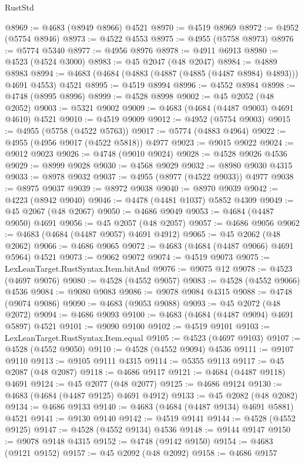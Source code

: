 \begin{lexlean}{RustStd}
\begin{coremodule}
@8969 := @4683 (@8949 @8966) @4521
@8970 := @4519 @8969
@8972 := @4952 (@5754 @8946)
@8973 := @4522 @4553
@8975 := @4955 (@5758 @8973)
@8976 := @5774 @5340
@8977 := @4956 @8976
@8978 := @4911 @6913
@8980 := @4523 (@4524 @3000)
@8983 := @45 @2047 (@48 @2047)
@8984 := @4889 @8983
@8994 := @4683 (@4684 (@4883 (@4887 (@4885 (@4487 @8984) @4893))) @4691 @4553) @4521
@8995 := @4519 @8994
@8996 := @4552 @8984
@8998 := @4748 (@8995 @8996)
@8999 := @4528 @8998
@9002 := @45 @2052 (@48 @2052)
@9003 := @5321 @9002
@9009 := @4683 (@4684 (@4487 @9003) @4691 @4610) @4521
@9010 := @4519 @9009
@9012 := @4952 (@5754 @9003)
@9015 := @4955 (@5758 (@4522 @5763))
@9017 := @5774 (@4883 @4964)
@9022 := @4955 (@4956 @9017 (@4522 @5818)) @4977
@9023 := @9015 @9022
@9024 := @9012 @9023
@9026 := @4748 (@9010 @9024)
@9028 := @4528 @9026 @4536
@9029 := @8999 @9028
@9030 := @4568 @9029
@9032 := @8980 @9030 @4315
@9033 := @8978 @9032
@9037 := @4955 (@8977 (@4522 @9033)) @4977
@9038 := @8975 @9037
@9039 := @8972 @9038
@9040 := @8970 @9039
@9042 := @4223 (@8942 @9040)
@9046 := @4478 (@4481 @1037) @5852 @4309
@9049 := @45 @2067 (@48 @2067)
@9050 := @4686 @9049
@9053 := @4684 (@4487 @9050) @4691
@9056 := @45 @2057 (@48 @2057)
@9057 := @4686 @9056
@9062 := @4683 (@4684 (@4487 @9057) @4691 @4912)
@9065 := @45 @2062 (@48 @2062)
@9066 := @4686 @9065
@9072 := @4683 (@4684 (@4487 @9066) @4691 @5964) @4521
@9073 := @9062 @9072
@9074 := @4519 @9073
@9075 := LexLeanTarget.RustSyntax.Item.bitAnd
@9076 := @9075 @12
@9078 := @4523 (@4697 @9076)
@9080 := @4528 (@4552 @9057)
@9083 := @4528 (@4552 @9066) @4536
@9084 := @9080 @9083
@9086 := @9078 @9084 @4315
@9088 := @4748 (@9074 @9086)
@9090 := @4683 (@9053 @9088)
@9093 := @45 @2072 (@48 @2072)
@9094 := @4686 @9093
@9100 := @4683 (@4684 (@4487 @9094) @4691 @5897) @4521
@9101 := @9090 @9100
@9102 := @4519 @9101
@9103 := LexLeanTarget.RustSyntax.Item.equal
@9105 := @4523 (@4697 @9103)
@9107 := @4528 (@4552 @9050)
@9110 := @4528 (@4552 @9094) @4536
@9111 := @9107 @9110
@9113 := @9105 @9111 @4315
@9114 := @5355 @9113
@9117 := @45 @2087 (@48 @2087)
@9118 := @4686 @9117
@9121 := @4684 (@4487 @9118) @4691
@9124 := @45 @2077 (@48 @2077)
@9125 := @4686 @9124
@9130 := @4683 (@4684 (@4487 @9125) @4691 @4912)
@9133 := @45 @2082 (@48 @2082)
@9134 := @4686 @9133
@9140 := @4683 (@4684 (@4487 @9134) @4691 @5881) @4521
@9141 := @9130 @9140
@9142 := @4519 @9141
@9144 := @4528 (@4552 @9125)
@9147 := @4528 (@4552 @9134) @4536
@9148 := @9144 @9147
@9150 := @9078 @9148 @4315
@9152 := @4748 (@9142 @9150)
@9154 := @4683 (@9121 @9152)
@9157 := @45 @2092 (@48 @2092)
@9158 := @4686 @9157

\end{coremodule}
\end{lexlean}
